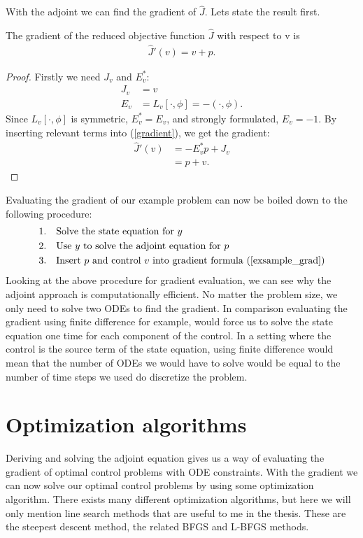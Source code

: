 With the adjoint we can find the gradient of $\hat{J}$. Lets state the result first.
\begin{theorem}
The gradient of the reduced objective function $\hat{J}$ with respect to v is
\begin{align}
\hat{J}'(v)=v+p. \label{exsample_grad}
\end{align} 
\end{theorem}
\begin{proof}
Firstly we need $J_v$ and $E_v^*$:
\begin{align*}
J_v &= v \\
E_v &= L_v[\cdot,\phi] = -(\cdot,\phi).
\end{align*}
Since $L_v[\cdot,\phi]$ is symmetric, $E_v^*=E_v$, and strongly formulated, $E_v=-1$. By inserting relevant terms into (\ref{gradient}), we get the gradient:
\begin{align*}
\hat{J}'(v)&=-E_v^*p + J_v \\
&= p+v. 
\end{align*} 
\end{proof}
Evaluating the gradient of our example problem can now be boiled down to the following procedure:
\begin{align*}
1.\quad & \textrm{Solve the state equation for $y$}\\
2.\quad & \textrm{Use $y$ to solve the adjoint equation for $p$}\\
3.\quad & \textrm{Insert $p$ and control $v$ into gradient formula (\ref{exsample_grad})}
\end{align*}
Looking at the above procedure for gradient evaluation, we can see why the adjoint approach is computationally efficient. No matter the problem size, we only need to solve two ODEs to find the gradient. In comparison evaluating the gradient using finite difference for example, would force us to solve the state equation one time for each component of the control. In a setting where the control is the source term of the state equation, using finite difference would mean that the number of ODEs we would have to solve would be equal to the number of time steps we used do discretize the problem.
\section{Optimization algorithms}
Deriving and solving the adjoint equation gives us a way of evaluating the gradient of optimal control problems with ODE constraints. With the gradient we can now solve our optimal control problems by using some optimization algorithm. There exists many different optimization algorithms, but here we will only mention line search methods that are useful to me in the thesis. These are the steepest descent method, the related BFGS and L-BFGS methods.  
